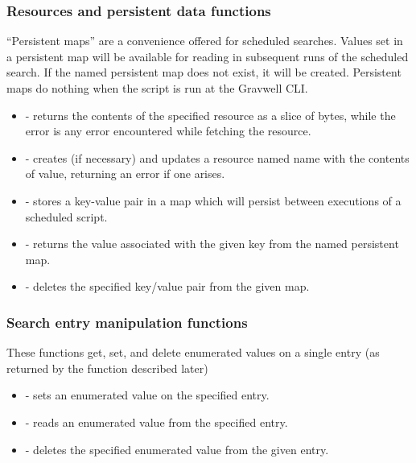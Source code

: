 \subsubsection{Resources and persistent data functions}

``Persistent maps'' are a convenience offered for scheduled searches.
Values set in a persistent map will be available for reading in
subsequent runs of the scheduled search. If the named persistent map
does not exist, it will be created. Persistent maps do nothing when the
script is run at the Gravwell CLI.

\begin{itemize}
\tightlist
\item
   - returns the contents of the specified resource
  as a slice of bytes, while the error is any error encountered while fetching the resource.
\item
   - creates (if necessary) and updates
  a resource named name with the contents of value, returning an error
  if one arises.
\item
   - stores a key-value pair
  in a map which will persist between executions of a scheduled script.
\item
   - returns the value
  associated with the given key from the named persistent map.
\item
   - deletes the specified key/value
  pair from the given map.
\end{itemize}

\subsubsection{Search entry manipulation functions}

These functions get, set, and delete enumerated values on a single
entry (as returned by the  function described later)

\begin{itemize}
\tightlist
\item
   - sets an enumerated value on the
  specified entry.
\item
   - reads an enumerated value
  from the specified entry.
\item
   - deletes the specified enumerated value
  from the given entry.
\end{itemize}

